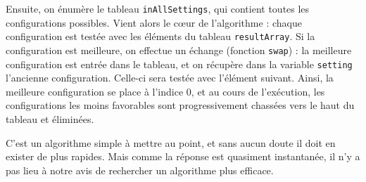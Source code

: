 Ensuite, on énumère le tableau \texttt{inAllSettings}, qui contient toutes les configurations possibles. Vient alors le cœur de l'algorithme : chaque configuration est testée avec les éléments du tableau \texttt{resultArray}. Si la configuration est meilleure, on effectue un échange (fonction \texttt{swap}) : la meilleure configuration est entrée dans le tableau, et on récupère dans la variable \texttt{setting} l'ancienne configuration. Celle-ci sera testée avec l'élément suivant. Ainsi, la meilleure configuration se place à l'indice $0$, et au cours de l'exécution, les configurations les moins favorables sont progressivement chassées vers le haut du tableau et éliminées.

C'est un algorithme simple à mettre au point, et sans aucun doute il doit en exister de plus rapides. Mais comme la réponse est quasiment instantanée, il n'y a pas lieu à notre avis de rechercher un algorithme plus efficace.



